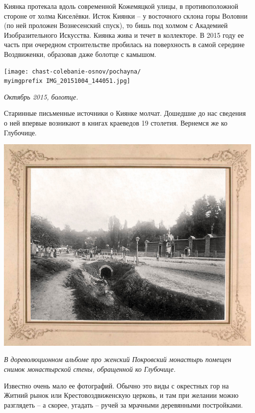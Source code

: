 Киянка протекала вдоль современной Кожемяцкой улицы, в противоположной стороне от холма Киселёвки. Исток Киянки – у восточного склона горы Воловни (по ней проложен Вознесенский спуск), то бишь под холмом с Академией Изобразительного Искусства. Киянка жива и течет в коллекторе. В 2015 году ее часть при очередном строительстве пробилась на поверхность в самой середине Воздвиженки, образовав даже болотце с камышом.

\begin{center}
\texttt{[image: chast-colebanie-osnov/pochayna/\\myimgprefix IMG\_20151004\_144051.jpg]}

\textit{Октябрь 2015, болотце.}
\end{center}

Старинные письменные источники о Киянке молчат. Дошедшие до нас сведения о ней впервые возникают в книгах краеведов 19 столетия. Вернемся же ко Глубочице.

\begin{center}
\includegraphics[width=\linewidth]{chast-colebanie-osnov/pochayna/glub-01.jpg}

\textit{В дореволюционном альбоме про женский Покровский монастырь помещен снимок монастырской стены, обращенной ко Глубочице.}
\end{center}

Известно очень мало ее фотографий. Обычно это виды с окрестных гор на Житний рынок или Крестовоздвиженскую церковь, и там при желании можно разглядеть – а скорее, угадать – ручей за мрачными деревянными постройками.
 
